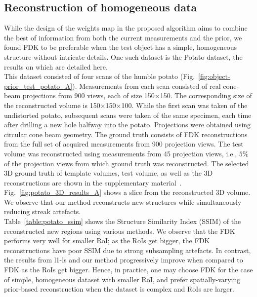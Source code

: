 \documentclass[journal]{IEEEtran}
\begin{document}
\subsection{Reconstruction of homogeneous data}
\label{Sec:potato}
While the design of the weights map in the proposed algorithm aims to combine the best of information from both the current measurements and the prior, we found FDK to be preferable when the test object has a simple, homogeneous structure without intricate details. One such dataset is the Potato dataset, the results on which are detailed here.\\
This dataset consisted of four scans of the humble potato (Fig.~\ref{fig:object-prior_test_potato_A}). Measurements from each scan consisted of real cone-beam projections from 900 views, each of size 150$\times$150. The corresponding size of the reconstructed volume is 150$\times$150$\times$100. While the first scan was taken of the undistorted potato, subsequent scans were taken of the same specimen, each time after drilling a new hole halfway into the potato.  Projections were obtained using circular cone beam geometry.  %
The ground truth consists of FDK reconstructions from the full set of acquired measurements from 900 projection views. The test volume was reconstructed using measurements from 45 projection views, i.e., $5\%$ of the projection views from which ground truth was reconstructed.  The selected 3D
ground truth of template volumes, test volume, as well as the 3D reconstructions are shown in the supplementary material~\cite{supp_paper}. Fig.~\ref{fig:potato_3D_results_A} shows a slice from the reconstructed 3D volume. We observe that our method reconstructs new structures while simultaneously reducing streak artefacts.\\ %
Table~\ref{table:potato_ssim} shows the Structure Similarity Index (SSIM) of the reconstructed new regions using various methods. We observe that the FDK performs very well for smaller RoI; as the RoIs get bigger, the FDK reconstructions have poor SSIM due to strong subsampling artefacts. In contrast, the results from l1-ls and our method progressively improve when compared to FDK as the RoIs get bigger. Hence, in practice, one may choose FDK for the case of simple, homogeneous dataset with smaller RoI,  and prefer spatially-varying prior-based reconstruction when the dataset is complex and RoIs are larger.
\end{document}

